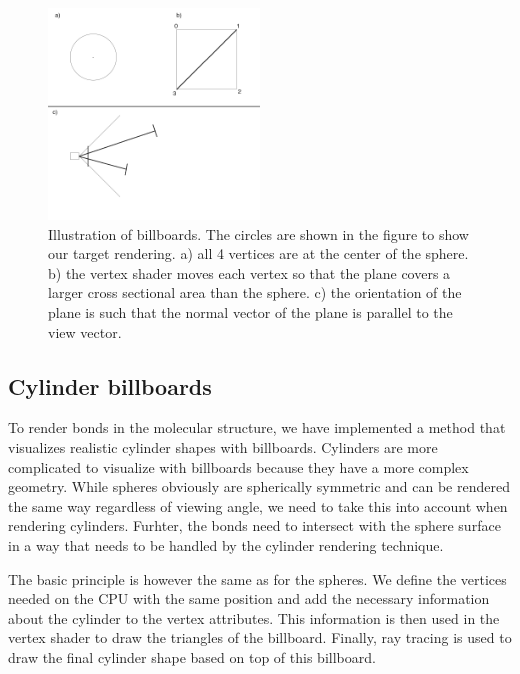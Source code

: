 \documentclass[aps,pre,twocolumn,letterpaper,floatfix]{revtex4}
\begin{document}
{\begin{figure}
	\centering
	\includegraphics[width=0.5\textwidth]{spherebillboards.png}
	\caption{Illustration of billboards. The circles are shown in the figure to show our target rendering. a) all 4 vertices are at the center of the sphere. b) the vertex shader moves each vertex so that the plane covers a larger cross sectional area than the sphere. c) the orientation of the plane is such that the normal vector of the plane is parallel to the view vector. }
	\label{fig:billboards}
\end{figure}

\subsection{Cylinder billboards}
%
To render bonds in the molecular structure, we have implemented a method that
visualizes realistic cylinder shapes with billboards.
Cylinders are more complicated to visualize with billboards because they have a
more complex geometry.
While spheres obviously are spherically symmetric and can be rendered the same
way regardless of viewing angle, we need to take this into account when
rendering cylinders.
Furhter, the bonds need to intersect with the sphere surface in a way that
needs to be handled by the cylinder rendering technique.

The basic principle is however the same as for the spheres.
We define the vertices needed on the CPU with the same position and add the
necessary information about the cylinder to the vertex attributes.
This information is then used in the vertex shader to draw the triangles of
the billboard.
Finally, ray tracing is used to draw the final cylinder shape based on top
of this billboard.


}
\end{document}
